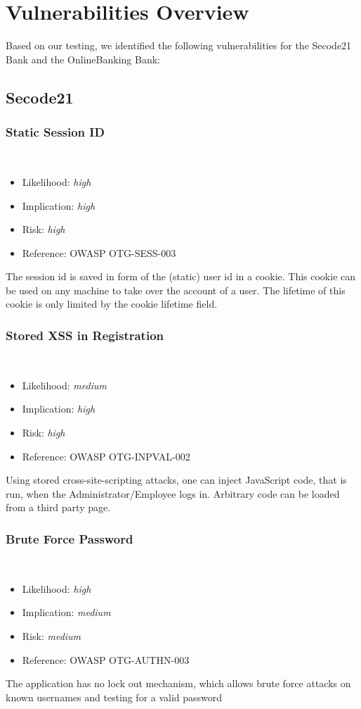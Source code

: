\documentclass[headsepline,footsepline,footinclude=false,oneside,fontsize=11pt,paper=a4,listof=totoc,bibliography=totoc]{scrbook} %
\begin{document}
\chapter{Vulnerabilities Overview}
Based on our testing, we identified the following vulnerabilities for the Secode21
Bank and the OnlineBanking Bank:
\section{Secode21}
\subsection{Static Session ID} \
\begin{itemize}
	\item Likelihood: \textit{high}
	\item Implication: \textit{high}
	\item Risk: \textit{high}
	\item Reference: OWASP OTG-SESS-003
\end{itemize}

The session id is saved in form of the (static) user id in a cookie. This cookie can be used on any machine
to take over the account of a user. The lifetime of this cookie is only limited by the cookie lifetime field.


\subsection{Stored XSS in Registration} \
\begin{itemize}
	\item Likelihood: \textit{medium}
	\item Implication: \textit{high}
	\item Risk: \textit{high}
	\item Reference: OWASP OTG-INPVAL-002
\end{itemize}

Using stored cross-site-scripting attacks, one can inject JavaScript code, that is run, when the Administrator/Employee logs in. Arbitrary code can be loaded from a third party page.

\subsection{Brute Force Password} \
\begin{itemize}
	\item Likelihood: \textit{high}
	\item Implication: \textit{medium}
	\item Risk: \textit{medium}
	\item Reference: OWASP OTG-AUTHN-003
\end{itemize}
The application has no lock out mechanism, which allows brute force attacks on known usernames and testing
for a valid password
\end{document}
